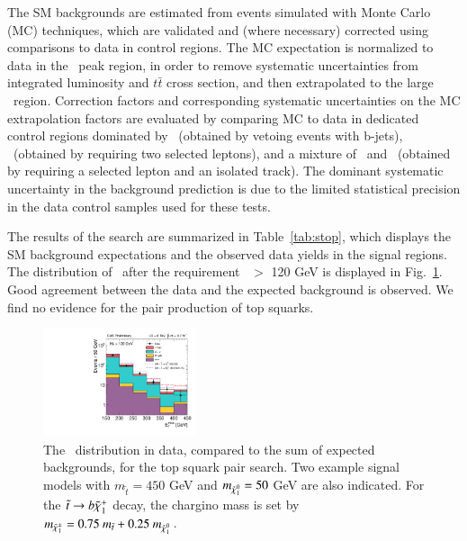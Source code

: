 The SM backgrounds are estimated from events simulated with Monte Carlo (MC) techniques, which are validated and 
(where necessary) corrected using comparisons to data in control regions. The MC expectation is normalized to data in the \mt\ peak region,
in order to remove systematic uncertainties from integrated luminosity and $t\bar{t}$ cross section, and then extrapolated to the 
large \mt\ region. Correction factors and corresponding systematic uncertainties on the MC extrapolation factors are evaluated by 
comparing MC to data in dedicated control regions dominated by \wjets\ (obtained by vetoing events with b-jets), \ttll\ 
(obtained by requiring two selected leptons), and a mixture of \ttll\ and \ttljets\ (obtained by requiring a selected lepton and 
an isolated track). The dominant systematic uncertainty in the background prediction is due to the limited statistical precision in
the data control samples used for these tests.




The results of the search are summarized in Table~\ref{tab:stop}, which displays the SM background expectations and the observed data yields
in the signal regions. The distribution of \met\ after the requirement \mt\ $>$ 120 GeV is displayed in Fig.~\ref{fig:stop}. 
Good agreement between the data and the expected background is observed. We find no evidence
for the pair production of top squarks.

\begin{figure}
\centering
\includegraphics[width=0.4\textwidth]{HCPPlots/stopmet.pdf}
\caption{The \met\ distribution in data, compared to the sum of expected backgrounds, for the top squark pair search.
Two example signal models with $m_{\tilde{t}}=450$ GeV and $m_{\tilde{\chi}_{1}^{0}}=50$ GeV are also indicated. For the $\tilde{t}\to b\tilde{\chi}_{1}^{+}$
decay, the chargino mass is set by $m_{\tilde{\chi}_{1}^{\pm}}=0.75~m_{\tilde{t}}+0.25~m_{\tilde{\chi}_{1}^{0}}$.}
\label{fig:stop}       %
\end{figure}

